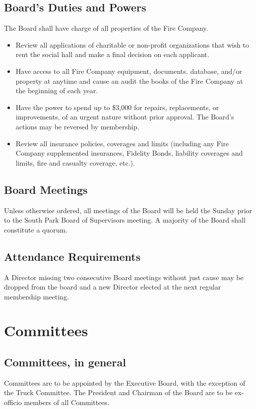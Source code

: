 ﻿\documentclass[12pt,letterpaper]{article}
\begin{document}
\subsection{Board's Duties and Powers}
The Board shall have charge of all properties of the Fire Company.
\begin{itemize}
\item Review all applications of charitable or non-profit organizations that wish to rent the social hall and make a final decision on each applicant. 
\item Have access to all Fire Company equipment, documents, database, and/or property at anytime and cause an audit the books of the Fire Company at the beginning of each year. 
\item Have the power to spend up to \$3,000 for repairs, replacements, or improvements, of an urgent nature without prior approval.  The Board’s actions may be reversed by membership.
\item Review all insurance policies, coverages and limits (including any Fire Company supplemented insurances, Fidelity Bonds, liability coverages and limits, fire and casualty coverage, etc.). 
\end{itemize}

\subsection{Board Meetings}
Unless otherwise ordered, all meetings of the Board will be held the Sunday prior to the South Park Board of Supervisors meeting.  A majority of the Board shall constitute a quorum. 

\subsection{Attendance Requirements}
A Director missing two consecutive Board meetings without just cause may be dropped from the board and a new Director elected at the next regular membership meeting.  

\section{Committees}

\subsection{Committees, in general}
Committees are to be appointed by the Executive Board, with the exception of the Truck Committee.  The President and Chairman of the Board are to be ex-officio members of all Committees.
\end{document}
